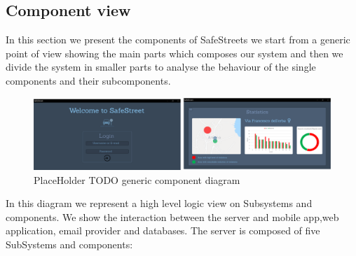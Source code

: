 \subsection{Component view}
In this section we present the components of SafeStreets we start from a generic point of view showing the main parts which composes our system and then we divide the system in smaller parts to analyse the behaviour of the single components and their subcomponents.
\begin{figure}[h]
\centering
\includegraphics[width=\textwidth]{Images/desktop_common_interface.png}
\caption{\label{fig:ComWI}PlaceHolder TODO generic component diagram}
\end{figure}
In this diagram we represent a high level logic view on Subsystems and components. We show the interaction between the server and mobile app,web application, email provider and databases.
The server is composed of five SubSystems and components:
